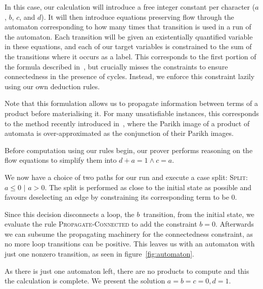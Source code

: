 \documentclass[runningheads]{llncs}
\begin{document}
  In this case, our calculation will introduce a free integer constant per
  character ($a$, $b$, $c$, and $d$). It will then introduce equations
  preserving flow through the automaton corresponding to how many times that
  transition is used in a run of the automaton. Each transition will be given an existentially
  quantified variable in these equations, and each of our target variables is
  constrained to the sum of the transitions where it occurs as a label. This
  corresponds to the first portion of the formula described
  in~\cite{generate-parikh-image}, but crucially misses the constraints to
  ensure connectedness in the presence of cycles. Instead, we enforce this
  constraint lazily using our own deduction rules.

  Note that this formulation allows us to propagate information between terms of
  a product before materialising it. For many unsatisfiable instances, this
  corresponds to the method recently introduced in~\cite{approximate-parikh},
  where the Parikh image of a product of automata is over-approximated as the
  conjunction of their Parikh images.
  
Before computation using our rules begin, our prover performs reasoning on the flow equations to simplify them into $d + a = 1 \land c = a$.

We now have a choice of two paths for our run and execute a case split: \textsc{Split}: $a \leq 0$ $\mid$ $a > 0$. The split is performed as close to the initial state as possible and favours deselecting an edge by constraining its corresponding term to be 0.

Since this decision disconnects a loop, the $b$~transition, from the initial state, we evaluate the rule \textsc{Propagate-Connected} to add the constraint $b = 0$. Afterwards we can subsume the propagating machinery for the connectedness constraint, as no more loop transitions can be positive. This leaves us with an automaton with just one nonzero transition, as seen in figure~\ref{fig:automaton}.

As there is just one automaton left, there are no products to compute and this the
calculation is complete. We present the solution $a = b = c = 0, d=1$.

%
\printbibliography
\end{document}
